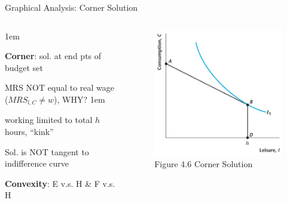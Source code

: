 \documentclass[11pt,aspectratio=43]{beamer}
\let\olditemize=\itemize
\let\endolditemize=\enditemize
\renewenvironment{itemize}{\olditemize \itemsep1em}{\endolditemize}
\theoremstyle{definition}
\begin{document}
\begin{frame}{Graphical Analysis: Corner Solution}
\label{slide:Graphical_Analysis__Corner_Solution}
    \begin{columns}
        \begin{column}{0.5\textwidth}
            \begin{itemize}
                \item \textbf{Corner}: sol. at end pts of budget set
                \item \alert{MRS} \alert{NOT} equal to \alert{real wage} ($MRS_{l, C} \neq w$), WHY?
                \begin{itemize}
                    \item working limited to total $ h $ hours, ``kink''
                \end{itemize}
                \item Sol. is NOT tangent to indifference curve
                \item \textbf{Convexity}: E v.s. H \& F v.s. H
            \end{itemize}
        \end{column}
        \begin{column}{0.5\textwidth}
            \begin{figure}
                \caption{Figure 4.6 Corner Solution}
                \includegraphics[width=\textwidth]{./figures/Figure4_6.jpg}
            \end{figure}
        \end{column}
    \end{columns}

\end{frame}
\end{document}
